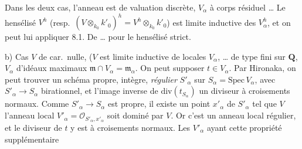 \documentclass[11pt,a4paper]{article}
\begin{document}


Dans les deux cas, l'anneau \struck{\ill{}}  est    \struck{\ill{}}  de valuation discrète, $V_{\alpha}$ à corps résiduel  \ill{} \ill{} … Le hensélisé $V^{h}$  (resp.\ $(V \otimes_{k_{0}} k'_{0})^{h} = V^{h} \otimes_{k_{0}} k'_{0}$) est limite inductive des $V_{\alpha}^{h}$, et on peut lui appliquer 8.1. De … pour le hensélisé strict.

b) Cas $V$ de car.\ nulle,  ($V$ est limite inductive de    locales $V_{\alpha}$, … de type fini sur $\mathbf{Q}$, \struck{\ill{}} $V_{\alpha}$ d'idéaux maximaux $\mathfrak{m} \cap V_{\alpha} = \mathfrak{m}_{\alpha}$. On peut supposer $t \in V_{\alpha}$. Par Hironaka, on peut trouver un \struck{\ill{}} schéma propre, \struck{\ill{}} intègre, \emph{régulier} $S'_{\alpha}$ sur $S_{\alpha} = \mathrm{Spec}\, V_{\alpha}$, avec $S'_{\alpha} \to S_{\alpha}$ birationnel, et \struck{\ill{}}  l'image inverse \struck{\ill{}} de $\mathrm{div}(t_{S_{\alpha}})$ un diviseur à croisements normaux.  Comme $S'_{\alpha} \to S_{\alpha}$ est propre, il existe un point $x'_{\alpha}$ de $S'_{\alpha}$ tel que $V$  l'anneau local $V'_{\alpha} = \mathcal{O}_{S'_{\alpha}, x'_{\alpha}}$ soit dominé par $V$.  Or c'est un anneau local régulier, et le diviseur de $t$ y est à croisements normaux.  Les $V'_{\alpha}$ ayant cette propriété supplémentaire

\end{document}
